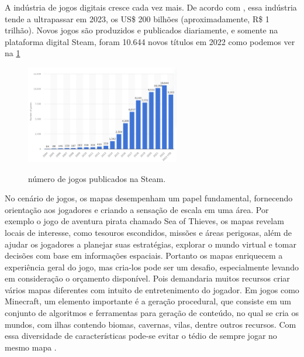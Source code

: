A indústria de jogos digitais cresce cada vez mais. De acordo com , essa indústria tende a ultrapassar em 2023, os US\$ 200 bilhões (aproximadamente, R\$ 1 trilhão). Novos jogos são produzidos e publicados diariamente, e somente na plataforma digital Steam, foram 10.644 novos títulos em 2022 como podemos ver na \cref{fig:steam_publishes} \space

\begin{figure}[!ht]
	\centering
    \caption{número de jogos publicados na Steam.}
	\includegraphics[width=0.6\textwidth]{figures/steam_sales.png}
	\label{fig:steam_publishes}
\end{figure}


No cenário de jogos, os mapas desempenham um papel fundamental, fornecendo orientação aos jogadores e criando a sensação de escala em uma área. Por exemplo o jogo de aventura pirata chamado Sea of Thieves, os mapas revelam locais de interesse, como tesouros escondidos, missões e áreas perigosas, além de ajudar os jogadores a planejar suas estratégias, explorar o mundo virtual e tomar decisões com base em informações espaciais. Portanto os mapas enriquecem a experiência geral do jogo, mas cria-los pode ser um desafio, especialmente levando em consideração o orçamento disponível. Pois demandaria muitos recursos criar vários mapas diferentes com intuito de entretenimento do jogador. Em jogos como Minecraft, um elemento importante é a geração procedural, que consiste em um conjunto de algoritmos e ferramentas para geração de conteúdo, no qual se cria os mundos, com ilhas contendo biomas, cavernas, vilas, dentre outros recursos. Com essa diversidade de características pode-se evitar o tédio de sempre jogar no mesmo mapa \space\cite{video-game-maps, lecafedugeek}.

